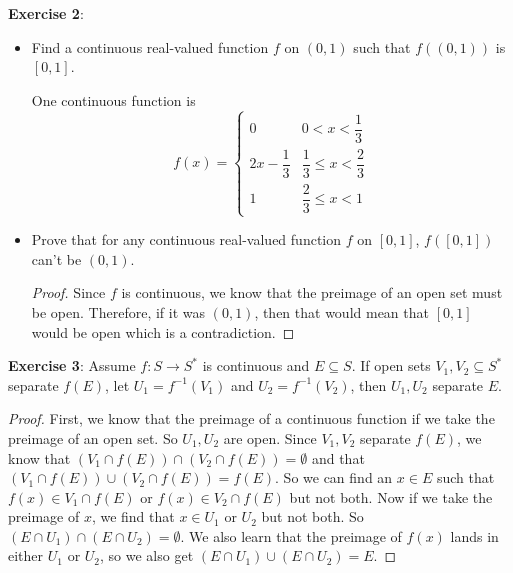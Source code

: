 \documentclass{article}
\begin{document}
\textbf{Exercise 2}: 
    \begin{itemize}
        \item Find a continuous real-valued function $f$ on $(0, 1)$ such that $f((0, 1))$ is $[0, 1]$.
            \begin{answer}
                One continuous function is
                    \begin{equation*}
                        f(x) = 
                            \begin{cases}
                                0                 & 0 < x < \dfrac{1}{3}              \\
                                2x - \dfrac{1}{3} & \dfrac{1}{3} \leq x <\dfrac{2}{3} \\
                                1                 & \dfrac{2}{3} \leq x < 1             
                            \end{cases}
                    \end{equation*}
            \end{answer}

        \item Prove that for any continuous real-valued function $f$ on $[0, 1]$, $f([0, 1])$ can't be $(0, 1)$. 
            \begin{proof}
                Since $f$ is continuous, we know that the preimage of an open set must be open. Therefore, if it was $(0, 1)$, then that would mean that $[0, 1]$ would be open which is a contradiction.
            \end{proof}
    \end{itemize}

\textbf{Exercise 3}: Assume $f: S \rightarrow S^{*}$ is continuous and $E \subseteq S$. If open sets $V_{1}, V_{2} \subseteq S^{*}$ separate $f(E)$, let $U_{1} = f^{-1}(V_{1})$ and $U_{2} = f^{-1}(V_{2})$, then $U_{1}, U_{2}$ separate $E$.
    \begin{proof}
        First, we know that the preimage of a continuous function if we take the preimage of an open set. So $U_{1}, U_{2}$ are open. Since $V_{1}, V_{2}$ separate $f(E)$, we know that $(V_{1} \cap f(E)) \cap (V_{2} \cap f(E)) = \emptyset$ and that $(V_{1} \cap f(E)) \cup (V_{2} \cap f(E)) = f(E)$. So we can find an $x \in E$ such that $f(x) \in V_{1} \cap f(E)$ or $f(x) \in V_{2} \cap f(E)$ but not both. Now if we take the preimage of $x$, we find that $x \in U_{1}$ or $U_{2}$ but not both. So $(E \cap U_{1}) \cap (E \cap U_{2}) = \emptyset$. We also learn that the preimage of $f(x)$ lands in either $U_{1}$ or $U_{2}$, so we also get $(E \cap U_{1}) \cup (E \cap U_{2}) = E$.
    \end{proof}
\end{document}

